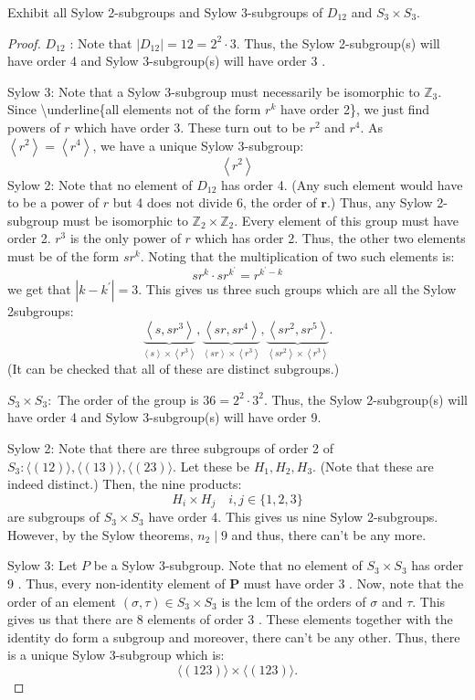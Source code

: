 \begin{exercise}
Exhibit all Sylow 2-subgroups and Sylow 3-subgroups of $D_{12}$ and $S_3 \times S_3$.
\end{exercise}
\begin{proof}
$D_{12}$ :
Note that $\left|D_{12}\right|=12=2^2 \cdot 3$. Thus, the Sylow 2-subgroup(s) will have order 4 and Sylow 3-subgroup(s) will have order 3 .

Sylow 3:
Note that a Sylow 3-subgroup must necessarily be isomorphic to $\mathbb{Z}_3$. Since \textbackslash{}underline\{all elements not of the form $r^k$ have order 2\}, we just find powers of $r$ which have order 3. These turn out to be $r^2$ and $r^4$. As $\left\langle r^2\right\rangle=\left\langle r^4\right\rangle$, we have a unique Sylow 3-subgroup:
\[
\left\langle r^2\right\rangle
\]
Sylow 2:
Note that no element of $D_{12}$ has order 4. (Any such element would have to be a power of $r$ but 4 does not divide 6, the order of $\boldsymbol{r}$.)
Thus, any Sylow 2-subgroup must be isomorphic to $\mathbb{Z}_2 \times \mathbb{Z}_2$.
Every element of this group must have order 2. $r^3$ is the only power of $r$ which has order 2. Thus, the other two elements must be of the form $s r^k$. Noting that the multiplication of two such elements is:
\[
s r^k \cdot s r^{k^{\prime}}=r^{k^{\prime}-k}
\]
we get that $\left|k-k^{\prime}\right|=3$. This gives us three such groups which are all the Sylow 2subgroups:
\[
\underbrace{\left\langle s, s r^3\right\rangle}_{\left\langle s\right\rangle\times \left\langle r^3\right\rangle},\underbrace{\left\langle s r, s r^4\right\rangle}_{\left\langle s r\right\rangle\times \left\langle r^3\right\rangle},\underbrace{\left\langle s r^2, s r^5\right\rangle}_{\left\langle s r^2\right\rangle\times \left\langle r^3\right\rangle} .
\]
(It can be checked that all of these are distinct subgroups.)

$S_3 \times S_3:$
The order of the group is $36=2^2 \cdot 3^2$. Thus, the Sylow 2-subgroup(s) will have order 4 and Sylow 3-subgroup(s) will have order 9.

Sylow 2:
Note that there are three subgroups of order 2 of $S_3:\langle(12)\rangle,\langle(13)\rangle,\langle (23)\rangle$. Let these be $H_1, H_2, H_3$. (Note that these are indeed distinct.)
Then, the nine products:
\[
H_i \times H_j \quad i, j \in\{1,2,3\}
\]
are subgroups of $S_3 \times S_3$ have order 4. This gives us nine Sylow 2-subgroups. However, by the Sylow theorems, $n_2 \mid 9$ and thus, there can't be any more.

Sylow 3:
Let $P$ be a Sylow 3-subgroup. Note that no element of $S_3 \times S_3$ has order 9 . Thus, every non-identity element of $\boldsymbol{P}$ must have order 3 . Now, note that the order of an element $(\sigma, \tau) \in S_3 \times S_3$ is the lcm of the orders of $\sigma$ and $\tau$. This gives us that there are 8 elements of order 3 . These elements together with the identity do form a subgroup and moreover, there can't be any other. Thus, there is a unique Sylow 3-subgroup which is:
\[
\langle(123)\rangle \times\langle(123)\rangle .
\]
\end{proof}

